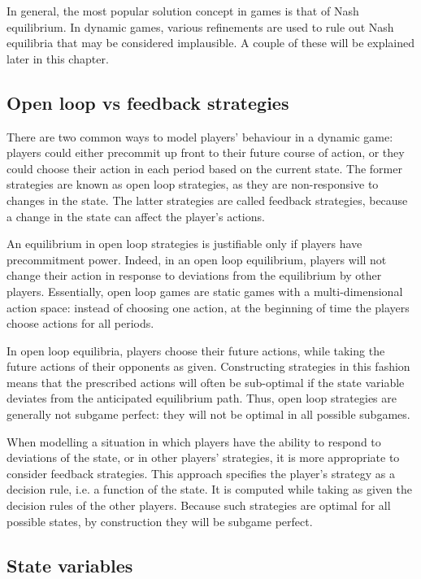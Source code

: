 In general, the most popular solution concept in games is that of Nash
equilibrium. In dynamic games, various refinements are used to rule out Nash
equilibria that may be considered implausible. A couple of these will be
explained later in this chapter.

\subsection{Open loop vs feedback strategies}

\label{sec:open loop-vs} There are two common ways to model players'
behaviour in a dynamic game: players could either precommit up front to
their future course of action, or they could choose their action in each
period based on the current state. The former strategies are known as open
loop strategies, as they are non-responsive to changes in the state. The
latter strategies are called feedback strategies, because a change in the
state can affect the player's actions.

An equilibrium in open loop strategies is justifiable only if players have
precommitment power. Indeed, in an open loop equilibrium, players will not
change their action in response to deviations from the equilibrium by other
players. Essentially, open loop games are static games with a
multi-dimensional action space: instead of choosing one action, at the
beginning of time the players choose actions for all periods.

In open loop equilibria, players choose their future actions, while taking
the future actions of their opponents as given. Constructing strategies in
this fashion means that the prescribed actions will often be sub-optimal if
the state variable deviates from the anticipated equilibrium path. Thus,
open loop strategies are generally not subgame perfect: they will not be
optimal in all possible subgames.

When modelling a situation in which players have the ability to respond to
deviations of the state, or in other players' strategies, it is more
appropriate to consider feedback strategies. This approach specifies the
player's strategy as a decision rule, i.e. a function of the state. It is
computed while taking as given the decision rules of the other players.
Because such strategies are optimal for all possible states, by construction
they will be subgame perfect.

\subsection{State variables}

